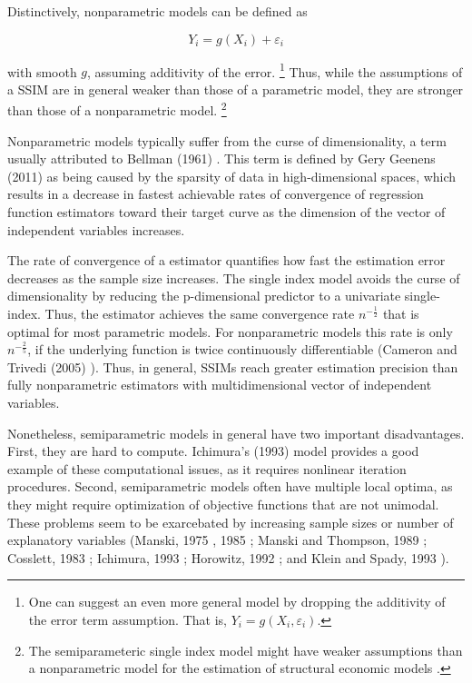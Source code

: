 \documentclass[a4paper]{article}
\begin{document}
Distinctively, nonparametric models can be defined as
  
\[Y_i = g(X_i) + \varepsilon_i\]

with smooth $g$, assuming additivity of the error. \footnote{One can suggest an even more general model by dropping the additivity of the error term assumption. That is, $Y_i = g(X_i, \varepsilon_i) $. } Thus, while the assumptions of a SSIM are in general weaker than those of a parametric model, they are stronger than those of a nonparametric model. \footnote{The semiparameteric single index model might have weaker assumptions than a nonparametric model for the estimation of structural economic models \cite{[13]}.} 

Nonparametric models typically suffer from the curse of dimensionality, a term usually attributed to Bellman (1961) \cite{[3]}. This term is defined by Gery Geenens (2011) \cite{[4]} as being caused by the sparsity of data in high-dimensional spaces, which results in a decrease in fastest achievable rates of convergence of regression function estimators toward their target curve as the dimension of the vector of independent variables increases. 

The rate of convergence of a estimator quantifies how fast the estimation error decreases as the sample size increases. The single index model avoids the curse of dimensionality by reducing the p-dimensional predictor to a univariate single-index. Thus, the estimator achieves the same convergence rate $n^{-\frac{1}{2}}$ that is optimal for most parametric models. For nonparametric models this rate is only $n^{-\frac{2}{5}}$, if the underlying function is twice continuously differentiable (Cameron and Trivedi (2005) \cite{[5]}).
Thus, in general, SSIMs reach greater estimation precision than fully nonparametric estimators with multidimensional vector of independent variables.



Nonetheless, semiparametric models in general have two important disadvantages. First, they are hard to compute. Ichimura's (1993) \cite{[6]} model provides a good example of these computational issues, as it requires nonlinear iteration procedures. Second, semiparametric models often have multiple local optima, as they might require optimization of objective functions that are not unimodal. These problems seem to be exarcebated by increasing sample sizes or number of explanatory variables (Manski, 1975 \cite{[7]}, 1985 \cite{[8]}; Manski and Thompson, 1989 \cite{[9]}; Cosslett, 1983 \cite{[10]}; Ichimura, 1993 \cite{[6]}; Horowitz, 1992 \cite{[11]}; and Klein and Spady, 1993 \cite{[12]} ).
\end{document}
